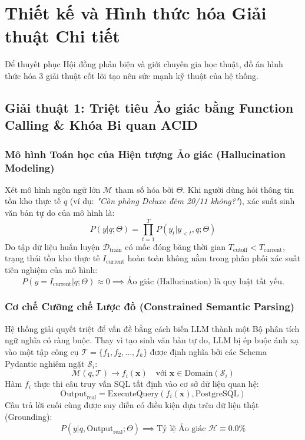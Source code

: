 \section{Thiết kế và Hình thức hóa Giải thuật Chi tiết}
\label{sec:thiet_ke_giai_thuat}

Để thuyết phục Hội đồng phản biện và giới chuyên gia học thuật, đồ án hình thức hóa 3 giải thuật cốt lõi tạo nên sức mạnh kỹ thuật của hệ thống.

\subsection{Giải thuật 1: Triệt tiêu Ảo giác bằng Function Calling \& Khóa Bi quan ACID}
\label{subsec:algo1_acid_locking}

\subsubsection{Mô hình Toán học của Hiện tượng Ảo giác (Hallucination Modeling)}
Xét mô hình ngôn ngữ lớn $\mathcal{M}$ tham số hóa bởi $\Theta$. Khi người dùng hỏi thông tin tồn kho thực tế $q$ (ví dụ: \textit{"Còn phòng Deluxe đêm 20/11 không?"}), xác suất sinh văn bản tự do của mô hình là:
\begin{equation}
P(y | q; \Theta) = \prod_{t=1}^{T} P(y_t | y_{<t}, q; \Theta)
\end{equation}
Do tập dữ liệu huấn luyện $\mathcal{D}_{\text{train}}$ có mốc đóng băng thời gian $T_{\text{cutoff}} < T_{\text{current}}$, trạng thái tồn kho thực tế $I_{\text{current}}$ hoàn toàn không nằm trong phân phối xác suất tiên nghiệm của mô hình:
\begin{equation}
P(y = I_{\text{current}} | q; \Theta) \approx 0 \implies \text{Ảo giác (Hallucination) là quy luật tất yếu.}
\end{equation}

\subsubsection{Cơ chế Cưỡng chế Lược đồ (Constrained Semantic Parsing)}
Hệ thống giải quyết triệt để vấn đề bằng cách biến LLM thành một Bộ phân tích ngữ nghĩa có ràng buộc. Thay vì tạo sinh văn bản tự do, LLM bị ép buộc ánh xạ vào một tập công cụ $\mathcal{T} = \{f_1, f_2, \dots, f_k\}$ được định nghĩa bởi các Schema Pydantic nghiêm ngặt $\mathcal{S}_i$:
\begin{equation}
\mathcal{M}(q, \mathcal{T}) \longrightarrow f_i(\mathbf{x}) \quad \text{với } \mathbf{x} \in \text{Domain}(\mathcal{S}_i)
\end{equation}
Hàm $f_i$ thực thi câu truy vấn SQL tất định vào cơ sở dữ liệu quan hệ:
\begin{equation}
\text{Output}_{\text{real}} = \text{ExecuteQuery}(f_i(\mathbf{x}), \text{PostgreSQL})
\end{equation}
Câu trả lời cuối cùng được suy diễn có điều kiện dựa trên dữ liệu thật (Grounding):
\begin{equation}
P(y | q, \text{Output}_{\text{real}}; \Theta) \implies \text{Tỷ lệ Ảo giác } \mathcal{H} \equiv 0.0\%
\end{equation}

